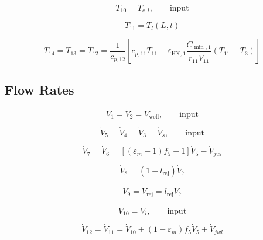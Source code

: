 \documentclass[14pt,letterpaper,fleqn]{extarticle}
\begin{document}
\begin{equation}
T_{10}
=
T_{e,l},
\qquad
\text{input}
\label{eq:T10}
\end{equation}

\begin{equation}
T_{11}
=
T_l(L,t)
\label{eq:T11}
\end{equation}

\begin{equation}
T_{14}
=
T_{13}
=
T_{12}
=
\frac{1}{c_{p,12}}
\left[
c_{p,11}T_{11}
-
\varepsilon_{\mathrm{HX},1}
\frac{C_{\min,1}}
{r_{11}\dot{V}_{11}}
\left(
T_{11}-T_3
\right)
\right]
\label{eq:T12-T14}
\end{equation}

\subsection*{Flow Rates}

\begin{equation}
\dot{V}_1
=
\dot{V}_2
=
\dot{V}_{\mathrm{well}},
\qquad
\text{input}
\label{eq:V1-V2}
\end{equation}

\begin{equation}
\dot{V}_5
=
\dot{V}_4
=
\dot{V}_3
=
\dot{V}_s,
\qquad
\text{input}
\label{eq:V3-V5}
\end{equation}

\begin{equation}
\dot{V}_7
=
\dot{V}_6
=
\left[
\left(
\varepsilon_m-1
\right)f_5+1
\right]
\dot{V}_5
-
\dot{V}_{jwl}
\label{eq:V6-V7}
\end{equation}

\begin{equation}
\dot{V}_8
=
\left(
1-l_{\mathrm{rej}}
\right)
\dot{V}_7
\label{eq:V8}
\end{equation}

\begin{equation}
\dot{V}_9
=
\dot{V}_{\mathrm{rej}}
=
l_{\mathrm{rej}}\dot{V}_7
\label{eq:V9}
\end{equation}

\begin{equation}
\dot{V}_{10}
=
\dot{V}_l,
\qquad
\text{input}
\label{eq:V10}
\end{equation}

\begin{equation}
\dot{V}_{12}
=
\dot{V}_{11}
=
\dot{V}_{10}
+
\left(
1-\varepsilon_m
\right)
f_5\dot{V}_5
+
\dot{V}_{jwl}
\label{eq:V11-V12}
\end{equation}
\end{document}
